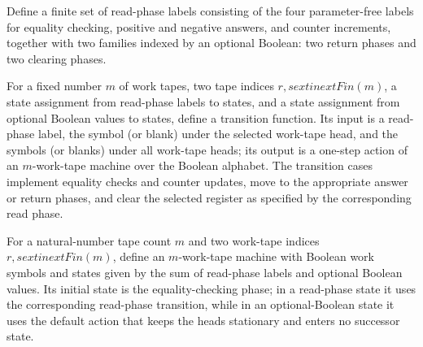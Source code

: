 \begin{definition}
\label{Complexity.LogProg.RdPh}
\leanok
Define a finite set of read-phase labels consisting of the four parameter-free labels
for equality checking, positive and negative answers, and counter increments, together
with two families indexed by an optional Boolean: two return phases and two clearing
phases.
\end{definition}

\begin{definition}
\label{Complexity.LogProg.readTr}
\leanok
{}
For a fixed number $m$ of work tapes, two tape indices $r,s	ext{ in }	ext{Fin}(m)$, a
state assignment from read-phase labels to states, and a state assignment from optional
Boolean values to states, define a transition function. Its input is a read-phase label,
the symbol (or blank) under the selected work-tape head, and the symbols (or blanks)
under all work-tape heads; its output is a one-step action of an $m$-work-tape machine
over the Boolean alphabet. The transition cases implement equality checks and counter
updates, move to the appropriate answer or return phases, and clear the selected
register as specified by the corresponding read phase.
\end{definition}

\begin{definition}
\label{Complexity.LogProg.readModel}
\leanok
{}
For a natural-number tape count $m$ and two work-tape indices $r,s	ext{ in
}	ext{Fin}(m)$, define an $m$-work-tape machine with Boolean work symbols and states
given by the sum of read-phase labels and optional Boolean values. Its initial state is
the equality-checking phase; in a read-phase state it uses the corresponding read-phase
transition, while in an optional-Boolean state it uses the default action that keeps the
heads stationary and enters no successor state.
\end{definition}

